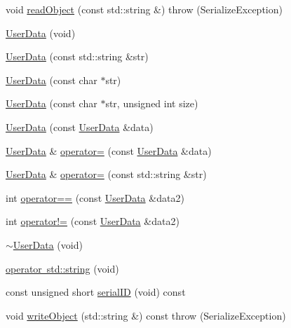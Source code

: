 \begin{DoxyCompactItemize}
\item 
void \mbox{\hyperlink{classFILEDB_1_1UserData_a61ccded861bac4b772af2488a2cc7605}{read\+Object}} (const std\+::string \&)  throw (\+Serialize\+Exception)
\item 
\mbox{\hyperlink{classFILEDB_1_1UserData_ab92cdcf29a782d8d731752d12f849919}{User\+Data}} (void)
\item 
\mbox{\hyperlink{classFILEDB_1_1UserData_a47d70a4d9bce994d9ec79e30642120f0}{User\+Data}} (const std\+::string \&str)
\item 
\mbox{\hyperlink{classFILEDB_1_1UserData_ad0aaf29e2f7dcd413f9dca937422aeec}{User\+Data}} (const char $\ast$str)
\item 
\mbox{\hyperlink{classFILEDB_1_1UserData_a69798b639088b04fe01c685485d8c695}{User\+Data}} (const char $\ast$str, unsigned int size)
\item 
\mbox{\hyperlink{classFILEDB_1_1UserData_af66756abed6a8abf8d1e32aa93b5db68}{User\+Data}} (const \mbox{\hyperlink{classFILEDB_1_1UserData}{User\+Data}} \&data)
\item 
\mbox{\hyperlink{classFILEDB_1_1UserData}{User\+Data}} \& \mbox{\hyperlink{classFILEDB_1_1UserData_a27ceb819128358fb4384362b9f8440d1}{operator=}} (const \mbox{\hyperlink{classFILEDB_1_1UserData}{User\+Data}} \&data)
\item 
\mbox{\hyperlink{classFILEDB_1_1UserData}{User\+Data}} \& \mbox{\hyperlink{classFILEDB_1_1UserData_ab41f011c29fc6e394dbb1b960c7947b0}{operator=}} (const std\+::string \&str)
\item 
int \mbox{\hyperlink{classFILEDB_1_1UserData_a1ba93b241613cfbecceabb9bf1040d2e}{operator==}} (const \mbox{\hyperlink{classFILEDB_1_1UserData}{User\+Data}} \&data2)
\item 
int \mbox{\hyperlink{classFILEDB_1_1UserData_acfdc12e0f4dbc6faebe8bf89856fee8d}{operator!=}} (const \mbox{\hyperlink{classFILEDB_1_1UserData}{User\+Data}} \&data2)
\item 
\mbox{\hyperlink{classFILEDB_1_1UserData_a1db23ff452703be8b538fc0c5a39cad2}{$\sim$\+User\+Data}} (void)
\item 
\mbox{\hyperlink{classFILEDB_1_1UserData_a5e54144b7f24d68684ddc85e036d0605}{operator std\+::string}} (void)
\item 
const unsigned short \mbox{\hyperlink{classFILEDB_1_1UserData_a2d1cee48b497ef3f25957ecb1464b7f5}{serial\+ID}} (void) const
\item 
void \mbox{\hyperlink{classFILEDB_1_1UserData_a42b5e25b3cba7274363590c5b6861795}{write\+Object}} (std\+::string \&) const  throw (\+Serialize\+Exception)

\end{DoxyCompactItemize}
